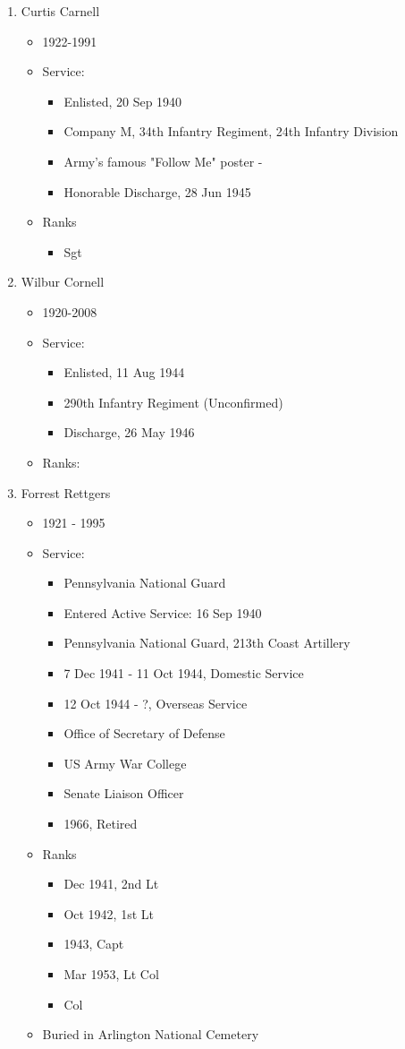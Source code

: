 \documentclass[11pt,letter]{book}
\begin{document}
\begin{enumerate}
\item Curtis Carnell
\begin{itemize}
\item 1922-1991
\item Service:
\begin{itemize}
\item Enlisted, 20 Sep 1940
\item Company M, 34th Infantry Regiment, 24th Infantry Division
\item Army's famous "Follow Me" poster -
\item Honorable Discharge, 28 Jun 1945
\end{itemize}
\item Ranks
\begin{itemize}
\item Sgt
\end{itemize}
\end{itemize}

\item Wilbur Cornell
\begin{itemize}
\item 1920-2008
\item Service:
\begin{itemize}
\item Enlisted, 11 Aug 1944
\item 290th Infantry Regiment (Unconfirmed)
\item Discharge, 26 May 1946
\end{itemize}
\item Ranks:
\end{itemize}

\item Forrest Rettgers
\begin{itemize}
\item 1921 - 1995
\item Service:
\begin{itemize}
\item Pennsylvania National Guard
\item Entered Active Service:  16 Sep 1940
\item Pennsylvania National Guard, 213th Coast Artillery
\item 7 Dec 1941 - 11 Oct 1944, Domestic Service
\item 12 Oct 1944 - ?, Overseas Service
\item Office of Secretary of Defense
\item US Army War College
\item Senate Liaison Officer
\item 1966, Retired
\end{itemize}
\item Ranks
\begin{itemize}
\item Dec 1941, 2nd Lt
\item Oct 1942, 1st Lt
\item 1943, Capt
\item Mar 1953, Lt Col
\item Col
\end{itemize}
\item Buried in Arlington National Cemetery
\end{itemize}


\end{enumerate}
\end{document}
